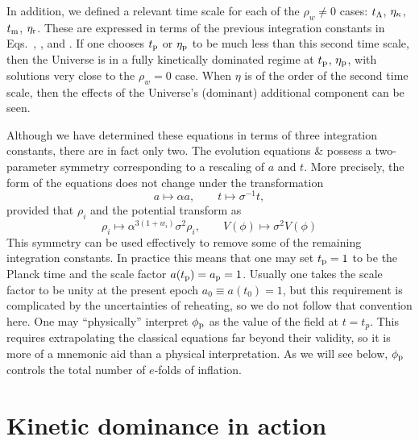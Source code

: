 In addition, we defined a relevant time scale for each of the $\rho_w
\neq 0$ cases: $t_\mathrm{\Lambda}$, $\eta_\mathrm{\kappa}$, $t_{\mathrm{m}}$, $\eta_{\mathrm{r}}$. These are expressed in
terms of the previous integration constants in Eqs.\ 
, ,  and . If
one chooses $t_{\mathrm{p}}$ or $\eta_{\mathrm{p}}$ to be much less than this second
time scale, then the Universe is in a fully kinetically dominated
regime at $t_{\mathrm{p}}$, $\eta_{\mathrm{p}}$, with solutions very close to the $\rho_w=0$
case. When $\eta$ is of the order of the second time scale, then the
effects of the Universe's (dominant) additional component can be seen.

Although we have determined these equations in terms of three
integration constants, there are in fact only two.  The evolution
equations \eref{eqn:Raychaudhuri_mod} \& \eref{eqn:Friedmann_mod}
possess a two-parameter symmetry corresponding to a rescaling of $a$
and $t$. More precisely, the form of the equations does not change
under the transformation
%
\begin{equation}
  a\mapsto\alpha a, 
  \qquad 
  t \mapsto\sigma^{-1}t,
\end{equation}
%
provided that $\rho_i$ and the potential transform as
%
\begin{equation}
  \rho_i \mapsto \alpha^{3(1+w_i)}\sigma^2\rho_i, 
  \qquad
  V(\phi) \mapsto \sigma^2 V(\phi)
\end{equation}
%
This symmetry can be used effectively to remove some of the remaining
integration constants. In practice this means that one may set $t_{\mathrm{p}}=1$
to be the Planck time and the scale factor $a(t_{\mathrm{p}})=a_{\mathrm{p}}=1$. Usually one
takes the scale factor to be unity at the present epoch $a_0\equiv
a(t_0)=1$, but this requirement is complicated by the uncertainties of
reheating, so we do not follow that convention here. One may
``physically'' interpret $\phi_{\mathrm{p}}$ as the value of the field at $t=t_p$.
This requires extrapolating the classical equations far beyond their
validity, so it is more of a mnemonic aid than a physical interpretation.
As we will see below, $\phi_{\mathrm{p}}$ controls the total number of $e$-folds
of inflation.













\section{Kinetic dominance in action}
\label{sec:Kinetic_dominance_in_action}

